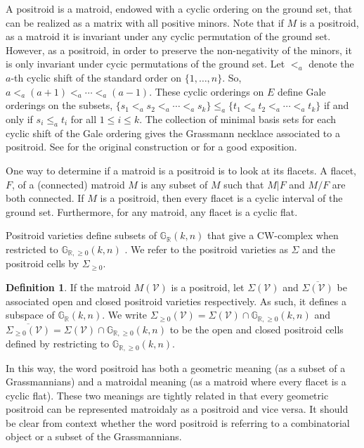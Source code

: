 \documentclass[11pt]{article}
\newcommand{\R}{\mathbb{R}}
\newcommand{\Gr}{\mathbb{G}_{\R, \geq 0}}
\newcommand{\Grall}{\mathbb{G}_{\R}}
\newcommand{\cV}{\mathcal{V}}
\newcommand{\Sigmapos}{\Sigma_{\geq 0}}
\theoremstyle{remark}
\theoremstyle{definition}
\newtheorem{dfn}[thm]{Definition}
\begin{document}
A positroid is a matroid, endowed with a cyclic ordering on the ground set, that can be realized as a matrix with all positive minors. Note that if $M$ is a positroid, as a matroid it is invariant under any cyclic permutation of the ground set. However, as a positroid, in order to  preserve the non-negativity of the minors, it is only invariant under cycic permutations of the ground set. Let $<_a$ denote the $a$-th cyclic shift of the standard order on $\{1, \dots, n\}$. So, $a <_a (a+1) <_a \cdots <_a (a-1)$. These cyclic orderings on $E$ define Gale orderings on the subsets, $\{s_1 <_a s_2 <_a \cdots <_a s_k\} \leq_a \{t_1 <_a t_2 <_a \cdots <_a t_k\}$ if and only if $s_i \leq_a t_i$ for all $1 \leq i \leq k$. The collection of minimal basis sets for each cyclic shift of the Gale ordering gives the Grassmann necklace associated to a positroid. See \cite[Section 16]{Postnikov} for the original construction or \cite{positroids13} for a good exposition.

One way to determine if a matroid is a positroid is to look at its flacets. A flacet, $F$, of a (connected) matroid $M$ is any subset of $M$ such that $M|F$ and $M/F$ are both connected. If $M$ is a positroid, then every flacet is a cyclic interval of the ground set. Furthermore, for any matroid, any flacet is a cyclic flat.

Positroid varieties define subsets of $\Grall(k,n)$ that give a CW-complex when restricted to $\Gr(k,n)$ \cite[Section 3]{Postnikov}. We refer to the positroid varieties as $\Sigma$ and the positroid cells by  $\Sigmapos$.

\begin{dfn}If the matroid $M(\cV)$ is a positroid, let $\Sigma(\cV)$ and $\overline{\Sigma(\cV)}$ be associated open and closed positroid varieties respectively. As such, it defines a subspace of $\Grall(k,n)$. We write $\Sigmapos(\cV) = \Sigma(\cV) \cap \Gr(k,n)$ and $\overline{\Sigmapos(\cV)} = \Sigma(\cV) \cap \Gr(k,n)$ to be the open and closed positroid cells defined by restricting to $\Gr(k,n)$. \end{dfn} 

In this way, the word positroid has both a geometric meaning (as a subset of a Grassmannians) and a matroidal meaning (as a matroid where every flacet is a cyclic flat). These two meanings are tightly related in that every geometric positroid can be represented matroidaly as a positroid and vice versa. It should be clear from context whether the word positroid is referring to a combinatorial object or a subset of the Grassmannians. %
\end{document}
